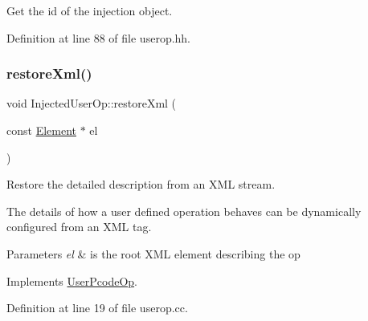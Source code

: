 Get the id of the injection object. 



Definition at line 88 of file userop.\+hh.

\mbox{\label{class_injected_user_op_ae0eb3ef1744912d47b0fd5f01c079515}} 
\subsubsection{\texorpdfstring{restoreXml()}{restoreXml()}}
{\footnotesize\ttfamily void Injected\+User\+Op\+::restore\+Xml (\begin{DoxyParamCaption}\item[{const \mbox{\hyperlink{class_element}{Element}} $\ast$}]{el }\end{DoxyParamCaption})\hspace{0.3cm}{\ttfamily [virtual]}}



Restore the detailed description from an X\+ML stream. 

The details of how a user defined operation behaves can be dynamically configured from an X\+ML tag. 
\begin{DoxyParams}{Parameters}
{\em el} & is the root X\+ML element describing the op \\
\hline
\end{DoxyParams}


Implements \mbox{\hyperlink{class_user_pcode_op_a2a7b7c637369bc4fba4604cd83a937af}{User\+Pcode\+Op}}.



Definition at line 19 of file userop.\+cc.

